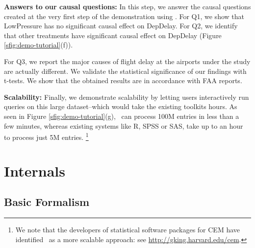 {     {\bf Answers to our causal questions:} %
In this step,  we answer the causal questions created at the very first step of the demonstration using
\GSQL. For Q1, we show that LowPressure has no significant causal effect on DepDelay.
For Q2, we identify that other treatments have significant causal effect on DepDelay
 (Figure \ref{sfig:demo-tutorial}(f)).
For Q3, we report the major causes of flight delay at the airports under the study are
     actually different. We validate the statistical significance of our findings with t-tests.
          We show that the obtained results are in accordance with
FAA reports. %





{\bf Scalability:} Finally, we demonstrate
  scalability by letting users interactively run queries on this large
   dataset--which would take the existing toolkits hours. As seen in Figure \ref{sfig:demo-tutorial}(g),
\GSQL\ can process 100M entries in less than a few minutes, whereas
existing systems like R, SPSS or SAS,
 take up to an hour to process just 5M entries. \footnote{We note that
   the
   developers of statistical software packages for CEM have identified
   \GSQL\ as a more scalable approach: see \url{http://gking.harvard.edu/cem}.}

\section{Internals}
\subsection{Basic Formalism}

}
